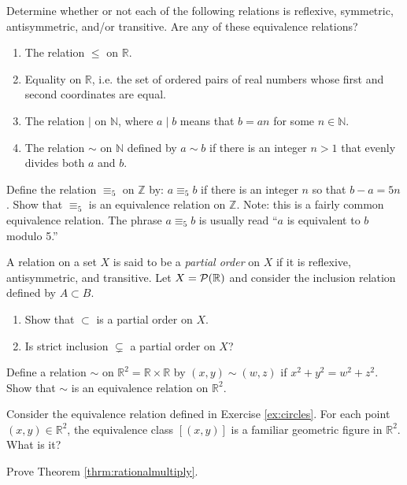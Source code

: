 \begin{exercise}\label{exer:relations}
Determine whether or not each of the following relations is reflexive, symmetric, antisymmetric, and/or transitive.  Are any of these equivalence relations?
\begin{enumerate}
\item The relation $\leq$ on $\mathbb R$.
\item Equality on $\mathbb R$, i.e. the set of ordered pairs of real numbers whose first and second coordinates are equal.
\item\label{relations:divides}\markit The relation $\mid$ on $\mathbb N$, where $a\mid b$ means that $b=an$ for some $n\in{\mathbb N}$.
\item The relation $\sim$ on $\mathbb N$ defined by $a\sim b$ if there is an integer $n>1$ that evenly divides both $a$ and $b$.
\end{enumerate}
\end{exercise}

\begin{exercise}\label{ex:modulo}
Define the relation $\equiv_5$ on $\mathbb Z$ by: $a\equiv_5 b$ if there is an integer $n$ so that $b-a=5n$.  Show that $\equiv_5$ is an equivalence relation on $\mathbb Z$.  Note: this is a fairly common equivalence relation.  The phrase $a\equiv_5 b$ is usually read ``$a$ is equivalent to $b$ modulo 5.''
\end{exercise}

\begin{exercise}
A relation on a set $X$ is said to be a \emph{partial order} on $X$ if it is reflexive, antisymmetric, and transitive. Let $X={\cal P}(\mathbb R)$ and consider the inclusion relation defined by $A\subset B$.
\begin{enumerate}
\item Show that $\subset$ is a partial order on $X$.
\item Is strict inclusion $\subsetneq$ a partial order on $X$? 
\end{enumerate}
\end{exercise}

\begin{exercise}\label{ex:circles}
Define a relation $\sim$ on $\mathbb R^2=\mathbb R\times\mathbb R$ by $(x,y)\sim(w,z)$ if $x^2+y^2=w^2+z^2$.  Show that $\sim$ is an equivalence relation on $\mathbb R^2$.
\end{exercise}

\begin{exercise}
Consider the equivalence relation defined in Exercise \ref{ex:circles}. For each point $(x,y)\in\mathbb R^2$, the equivalence class $[(x,y)]$ is a familiar geometric figure in $\mathbb R^2$. What is it?
\end{exercise}

\begin{exercise}\label{exer:rationalmultiply}
Prove Theorem \ref{thrm:rationalmultiply}.
\end{exercise}

\clearpage
